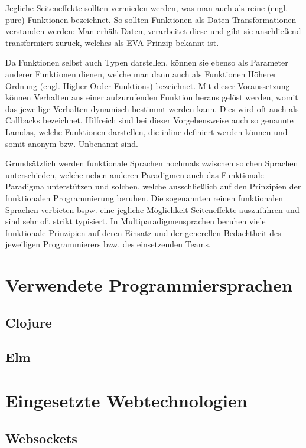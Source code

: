 Jegliche Seiteneffekte sollten vermieden werden, was man auch als reine (engl. pure) Funktionen bezeichnet.
So sollten Funktionen als Daten-Transformationen verstanden werden: Man erhält Daten, verarbeitet diese und gibt sie anschließend transformiert zurück, welches als \ac{EVA}-Prinzip bekannt ist.
\par
Da Funktionen selbst auch Typen darstellen, können sie ebenso als Parameter anderer Funktionen dienen, welche man dann auch als Funktionen Höherer Ordnung (engl. Higher Order Funktions) bezeichnet.
Mit dieser Voraussetzung können Verhalten aus einer aufzurufenden Funktion heraus gelöst werden, womit das jeweilige Verhalten dynamisch bestimmt werden kann.
Dies wird oft auch als Callbacks bezeichnet.
Hilfreich sind bei dieser Vorgehensweise auch so genannte Lamdas, welche Funktionen darstellen, die inline definiert werden können und somit anonym \ac{bzw.} Unbenannt sind.
\par
Grundsätzlich werden funktionale Sprachen nochmals zwischen solchen Sprachen unterschieden, welche neben anderen Paradigmen auch das Funktionale Paradigma unterstützen und solchen, welche ausschließlich auf den Prinzipien der funktionalen Programmierung beruhen.
Die sogenannten reinen funktionalen Sprachen verbieten \ac{bspw.} eine jegliche Möglichkeit Seiteneffekte auszuführen und sind sehr oft strikt typisiert.
In Multiparadigmensprachen beruhen viele funktionale Prinzipien auf deren Einsatz und der generellen Bedachtheit des jeweiligen Programmierers \ac{bzw.} des einsetzenden Teams.

\section{Verwendete Programmiersprachen}
\subsection{Clojure}
\blindtext
\par
\blindtext
\subsection{Elm}
\blindtext
\par
\blindtext
\section{Eingesetzte Webtechnologien}
\subsection{Websockets}
\blindtext
